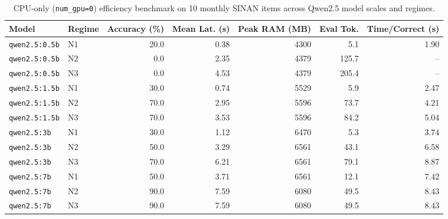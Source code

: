 \begin{table}[htbp]
\centering
\caption{CPU-only (\texttt{num\_gpu=0}) efficiency benchmark on 10 monthly SINAN items across Qwen2.5 model scales and regimes.}
\label{tab:cpu_efficiency}
\begin{tabular}{llrrrrr}
\toprule
Model & Regime & Accuracy (\%) & Mean Lat. (s) & Peak RAM (MB) & Eval Tok. & Time/Correct (s) \\
\midrule
\texttt{qwen2.5:0.5b} & N1 & 20.0 & 0.38 & 4300 & 5.1 & 1.90 \\
\texttt{qwen2.5:0.5b} & N2 & 0.0 & 2.35 & 4379 & 125.7 & -- \\
\texttt{qwen2.5:0.5b} & N3 & 0.0 & 4.53 & 4379 & 205.4 & -- \\
\texttt{qwen2.5:1.5b} & N1 & 30.0 & 0.74 & 5529 & 5.9 & 2.47 \\
\texttt{qwen2.5:1.5b} & N2 & 70.0 & 2.95 & 5596 & 73.7 & 4.21 \\
\texttt{qwen2.5:1.5b} & N3 & 70.0 & 3.53 & 5596 & 84.2 & 5.04 \\
\texttt{qwen2.5:3b} & N1 & 30.0 & 1.12 & 6470 & 5.3 & 3.74 \\
\texttt{qwen2.5:3b} & N2 & 50.0 & 3.29 & 6561 & 43.1 & 6.58 \\
\texttt{qwen2.5:3b} & N3 & 70.0 & 6.21 & 6561 & 79.1 & 8.87 \\
\texttt{qwen2.5:7b} & N1 & 50.0 & 3.71 & 6561 & 12.1 & 7.42 \\
\texttt{qwen2.5:7b} & N2 & 90.0 & 7.59 & 6080 & 49.5 & 8.43 \\
\texttt{qwen2.5:7b} & N3 & 90.0 & 7.59 & 6080 & 49.5 & 8.43 \\
\bottomrule
\end{tabular}
\end{table}
